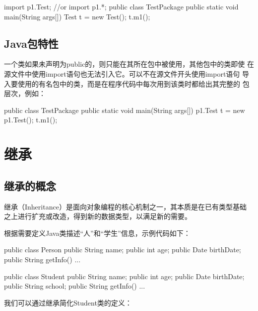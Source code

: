 \begin{javaCode}
  import p1.Test; //or import p1.*;
  public class TestPackage{
    public static void main(String args[]){
      Test t = new Test();
      t.m1();
    }
  }
\end{javaCode}

\subsection{Java包特性}

一个类如果未声明为public的，则只能在其所在包中被使用，其他包中的类即使
在源文件中使用import语句也无法引入它。可以不在源文件开头使用import语句
导入要使用的有名包中的类，而是在程序代码中每次用到该类时都给出其完整的
包层次，例如：

\begin{javaCode}
  public class TestPackage{ 
    public static void main(String args[]){ 
      p1.Test t = new p1.Test(); 
      t.m1(); 
    } 
  }
\end{javaCode}

\section{继承}

\subsection{继承的概念}

继承（Inheritance）是面向对象编程的核心机制之一，其本质是在已有类型基础
之上进行扩充或改造，得到新的数据类型，以满足新的需要。

根据需要定义Java类描述“人”和“学生”信息，示例代码如下：

\begin{javaCode}
  public class Person {
    public String name;
    public int age;
    public Date birthDate;
    public String getInfo() {...}
  }
\end{javaCode}


\begin{javaCode}
  public class Student {
    public String name;
    public int age;
    public Date birthDate;
    public String school;
    public String getInfo() {...}
  }
\end{javaCode}

我们可以通过继承简化Student类的定义：

